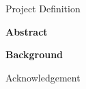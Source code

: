 
\newpage

\fontsize{18pt}{20pt}\selectfont

\vspace{25.3mm}
Project Definition

\normalsize\selectfont
\vspace{13.2mm}
\textbf{Abstract}  \medskip \\
\ToDo{\blindtext}



\par \bigskip


\normalsize\selectfont
\textbf{Background} \medskip \\
\ToDo{\blindtext}

\newpage

\fontsize{18pt}{20pt}\selectfont

\vspace{25.3mm}
Acknowledgement

\normalsize\selectfont
\vspace{13.2mm}
\ToDo{\blindtext}

